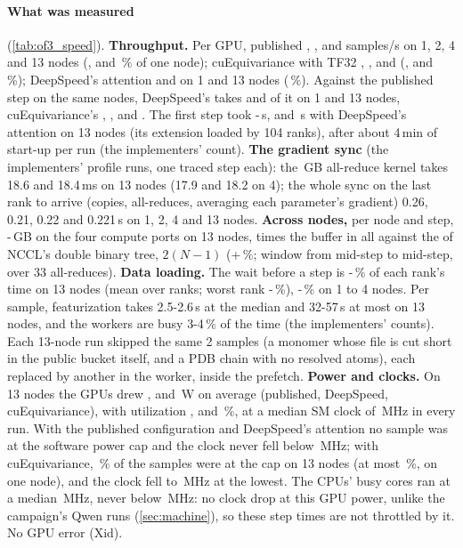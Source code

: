 \paragraph{What was measured} (\cref{tab:of3_speed}). \textbf{Throughput.} Per GPU, published \TriOfSpsPubOne, \TriOfSpsPubTwo, \TriOfSpsPubFour{} and \TriOfSpsPubThirteen{} samples/s on 1, 2, 4 and 13 nodes (\TriOfEffPubTwo, \TriOfEffPubFour{} and \TriOfEffPubThirteen\,\% of one node); cuEquivariance with TF32 \TriOfSpsCueqOne, \TriOfSpsCueqTwo, \TriOfSpsCueqFour{} and \TriOfSpsCueqThirteen{} (\TriOfEffCueqTwo, \TriOfEffCueqFour{} and \TriOfEffCueqThirteen\,\%); DeepSpeed's attention \TriOfSpsDsOne{} and \TriOfSpsDsThirteen{} on 1 and 13 nodes (\TriOfEffDsThirteen\,\%). Against the published step on the same nodes, DeepSpeed's takes \TriOfRatioDsOne{} and \TriOfRatioDsThirteen{} of it on 1 and 13 nodes, cuEquivariance's \TriOfRatioCueqOne, \TriOfRatioCueqTwo, \TriOfRatioCueqFour{} and \TriOfRatioCueqThirteen. The first step took \TriOfFirstLo-\TriOfFirstHi\,s, and \TriOfFirstDs\,s with DeepSpeed's attention on 13 nodes (its extension loaded by 104 ranks), after about 4\,min of start-up per run (the implementers' count). \textbf{The gradient sync} (the implementers' profile runs, one traced step each): the \TriOfBuffer\,GB all-reduce kernel takes 18.6 and 18.4\,ms on 13 nodes (17.9 and 18.2 on 4); the whole sync on the last rank to arrive (copies, all-reduces, averaging each parameter's gradient) 0.26, 0.21, 0.22 and 0.221\,s on 1, 2, 4 and 13 nodes. \textbf{Across nodes,} per node and step, \TriOfIbLo-\TriOfIbHi\,GB on the four compute ports on 13 nodes, \TriOfIbBuffersLo{} times the buffer in all against the \TriOfIbTree{} of NCCL's double binary tree, $2(N-1)$ (+\TriOfIbExcess\,\%; window from mid-step to mid-step, over 33 all-reduces). \textbf{Data loading.} The wait before a step is \TriOfGapLo-\TriOfGapHi\,\% of each rank's time on 13 nodes (mean over ranks; worst rank \TriOfGapWorstLo-\TriOfGapWorstHi\,\%), \TriOfGapSmallLo-\TriOfGapSmallHi\,\% on 1 to 4 nodes. Per sample, featurization takes 2.5-2.6\,s at the median and 32-57\,s at most on 13 nodes, and the workers are busy 3-4\,\% of the time (the implementers' counts). Each 13-node run skipped the same 2 samples (a monomer whose file is cut short in the public bucket itself, and a PDB chain with no resolved atoms), each replaced by another in the worker, inside the prefetch. \textbf{Power and clocks.} On 13 nodes the GPUs drew \TriOfPowerPub, \TriOfPowerDs{} and \TriOfPowerCueq\,W on average (published, DeepSpeed, cuEquivariance), with utilization \TriOfUtilPub, \TriOfUtilDs{} and \TriOfUtilCueq\,\%, at a median SM clock of \TriOfSm\,MHz in every run. With the published configuration and DeepSpeed's attention no sample was at the software power cap and the clock never fell below \TriOfSmMinPlain\,MHz; with cuEquivariance, \TriOfCapCueq\,\% of the samples were at the cap on 13 nodes (at most \TriOfCap\,\%, on one node), and the clock fell to \TriOfSmMin\,MHz at the lowest. The CPUs' busy cores ran at a median \TriOfCpuMed\,MHz, never below \TriOfCpuMinLo\,MHz: no clock drop at this GPU power, unlike the campaign's Qwen runs (\cref{sec:machine}), so these step times are not throttled by it. No GPU error (Xid). 
